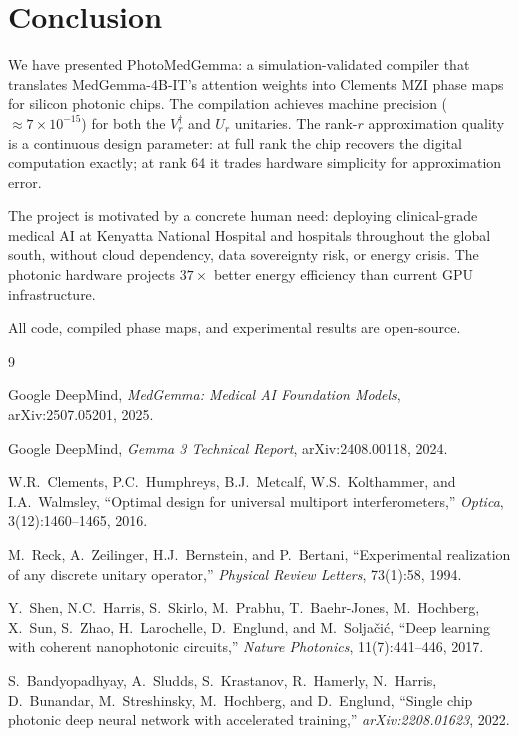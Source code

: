 \documentclass[12pt, a4paper]{article}
\begin{document}
\section{Conclusion}
\label{sec:conclusion}

We have presented PhotoMedGemma: a simulation-validated compiler
that translates MedGemma-4B-IT's attention weights into Clements MZI phase
maps for silicon photonic chips.
The compilation achieves machine precision ($\approx 7 \times 10^{-15}$) for
both the $V_r^\dagger$ and $U_r$ unitaries.
The rank-$r$ approximation quality is a continuous design parameter: at full
rank the chip recovers the digital computation exactly; at rank 64 it trades
hardware simplicity for approximation error.

The project is motivated by a concrete human need: deploying clinical-grade
medical AI at Kenyatta National Hospital and hospitals throughout the global
south, without cloud dependency, data sovereignty risk, or energy crisis.
The photonic hardware projects $37\times$ better energy efficiency than current
GPU infrastructure.

All code, compiled phase maps, and experimental results are open-source.


\begin{thebibliography}{9}

Google DeepMind,
\textit{MedGemma: Medical AI Foundation Models},
arXiv:2507.05201, 2025.

Google DeepMind,
\textit{Gemma 3 Technical Report},
arXiv:2408.00118, 2024.

W.R.\ Clements, P.C.\ Humphreys, B.J.\ Metcalf, W.S.\ Kolthammer,
and I.A.\ Walmsley,
``Optimal design for universal multiport interferometers,''
\textit{Optica}, 3(12):1460--1465, 2016.

M.\ Reck, A.\ Zeilinger, H.J.\ Bernstein, and P.\ Bertani,
``Experimental realization of any discrete unitary operator,''
\textit{Physical Review Letters}, 73(1):58, 1994.

Y.\ Shen, N.C.\ Harris, S.\ Skirlo, M.\ Prabhu, T.\ Baehr-Jones,
M.\ Hochberg, X.\ Sun, S.\ Zhao, H.\ Larochelle, D.\ Englund, and M.\ Solja\v{c}i\'{c},
``Deep learning with coherent nanophotonic circuits,''
\textit{Nature Photonics}, 11(7):441--446, 2017.

S.\ Bandyopadhyay, A.\ Sludds, S.\ Krastanov, R.\ Hamerly,
N.\ Harris, D.\ Bunandar, M.\ Streshinsky, M.\ Hochberg, and D.\ Englund,
``Single chip photonic deep neural network with accelerated training,''
\textit{arXiv:2208.01623}, 2022.

\end{thebibliography}
\end{document}

